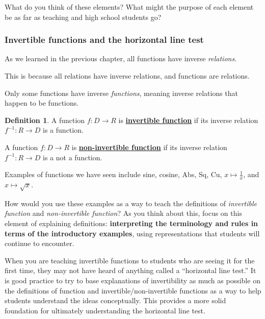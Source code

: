 \documentclass[11pt]{article}
\newenvironment{task}
	{\begin{mdframed}[linecolor=lightgray, linewidth=3pt]\raggedright}
	{\end{mdframed}}
\renewcommand\emph[1]{\underline{\bf{#1}}} %
\theoremstyle{definition}
\newtheorem{definition}[theorem]{Definition}
\begin{document}
\begin{task}
What do you think of these elements? What might the purpose of each element be as far as teaching and high school students go?
\end{task}


\subsubsection{Invertible functions and the horizontal line test}


As we learned in the previous chapter, all functions have inverse {\it relations}.

This is because all relations have inverse relations, and functions are relations.

Only some functions have inverse {\it functions}, meaning inverse relations that happen to be functions.

\begin{definition}\label{d: invertible function}
 A function $f:D\to R$ is \emph{invertible function} if its inverse relation $f^{-1}:R\to D$ is a function.

A function $f:D\to R$ is \emph{non-invertible function} if its inverse relation $f^{-1}:R\to D$ is a not a function.
\end{definition}

\begin{task}
Examples of functions we have seen include sine, cosine, Abs, Sq, Cu, $x\mapsto \frac{1}{x}$, and $x\mapsto \sqrt{x}$. 

How would you use these examples as a way to teach the definitions of {\it invertible function} and {\it non-invertible function}? As you think about this, focus on this element of explaining definitions: {\bf interpreting the terminology and rules in terms of the introductory examples}, using representations that students will continue to encounter.
\end{task}

When you are teaching invertible functions to students who are seeing it for the first time, they may not have heard of anything called a ``horizontal line test.''  It is good practice to try to base explanations of invertibility as much as possible on the definitions of function and invertible/non-invertible functions as a way to help students understand the ideas conceptually. This provides a more solid foundation for ultimately understanding the horizontal line test.
\end{document}
